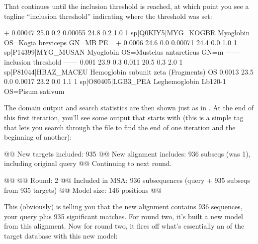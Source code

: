 That continues until the inclusion threshold is reached, at which
point you see a tagline ``inclusion threshold'' indicating where the
threshold was set:

\begin{samepage}
\begin{sreoutput}
+   0.00047   25.0   0.2    0.00055   24.8   0.2    1.0  1  sp|Q0KIY5|MYG_KOGBR    Myoglobin OS=Kogia breviceps GN=MB PE=
+    0.0006   24.6   0.0    0.00071   24.4   0.0    1.0  1  sp|P14399|MYG_MUSAN    Myoglobin OS=Mustelus antarcticus GN=m
  ------ inclusion threshold ------
      0.001   23.9   0.3      0.011   20.5   0.3    2.0  1  sp|P81044|HBAZ_MACEU   Hemoglobin subunit zeta (Fragments) OS
     0.0013   23.5   0.0     0.0017   23.2   0.0    1.1  1  sp|O80405|LGB3_PEA     Leghemoglobin Lb120-1 OS=Pisum sativum     
\end{sreoutput}
\end{samepage}

The domain output and search statistics are then shown just as in
. At the end of this first iteration, you'll see some
output that starts with  (this is a simple tag that lets you
search through the file to find the end of one iteration and the
beginning of another):

\begin{samepage}
\begin{sreoutput}
@@ New targets included:   935
@@ New alignment includes: 936 subseqs (was 1), including original query
@@ Continuing to next round.

@@
@@ Round:                  2
@@ Included in MSA:        936 subsequences (query + 935 subseqs from 935 targets)
@@ Model size:             146 positions
@@
\end{sreoutput}
\end{samepage}

This (obviously) is telling you that the new alignment contains 936
sequences, your query plus 935 significant matches. For round two,
it's built a new model from this alignment. Now for round two, it
fires off what's essentially an  of the target
database with this new model:

